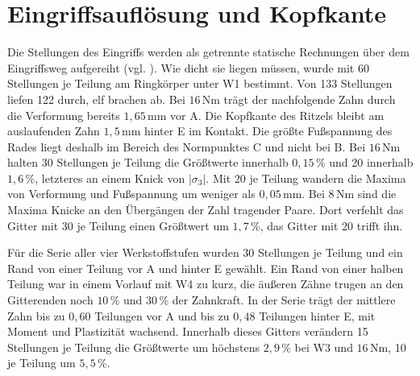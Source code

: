 
\section{Eingriffsauflösung und Kopfkante}
\label{sec:kopfkante}

Die Stellungen des Eingriffs werden als getrennte statische Rechnungen über dem Eingriffsweg aufgereiht (vgl. ). Wie dicht sie liegen müssen, wurde mit 60 Stellungen je Teilung am Ringkörper unter W1 bestimmt. Von 133 Stellungen liefen 122 durch, elf brachen ab. Bei $16$\,Nm trägt der nachfolgende Zahn durch die Verformung bereits $1{,}65$\,mm vor A. Die Kopfkante des Ritzels bleibt am auslaufenden Zahn $1{,}5$\,mm hinter E im Kontakt. Die größte Fußspannung des Rades liegt deshalb im Bereich des Normpunktes C und nicht bei B. Bei $16$\,Nm halten 30 Stellungen je Teilung die Größtwerte innerhalb $0{,}15$\,\% und 20 innerhalb $1{,}6$\,\%, letzteres an einem Knick von $|\sigma_{\mathrm{3}}|$. Mit 20 je Teilung wandern die Maxima von Verformung und Fußspannung um weniger als $0{,}05$\,mm. Bei $8$\,Nm sind die Maxima Knicke an den Übergängen der Zahl tragender Paare. Dort verfehlt das Gitter mit 30 je Teilung einen Größtwert um $1{,}7$\,\%, das Gitter mit 20 trifft ihn.

Für die Serie aller vier Werkstoffstufen wurden 30 Stellungen je Teilung und ein Rand von einer Teilung vor A und hinter E gewählt. Ein Rand von einer halben Teilung war in einem Vorlauf mit W4 zu kurz, die äußeren Zähne trugen an den Gitterenden noch $10$\,\% und $30$\,\% der Zahnkraft. In der Serie trägt der mittlere Zahn bis zu $0{,}60$ Teilungen vor A und bis zu $0{,}48$ Teilungen hinter E, mit Moment und Plastizität wachsend. Innerhalb dieses Gitters verändern 15 Stellungen je Teilung die Größtwerte um höchstens $2{,}9$\,\% bei W3 und $16$\,Nm, 10 je Teilung um $5{,}5$\,\%.

